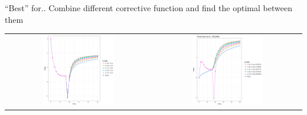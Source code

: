 \documentclass{beamer}
\begin{document}
\begin{frame}{``Best'' for..}
	Combine different corrective function and find the optimal between them
	\begin{table}
		\begin{tabular}{ cc }
			\includegraphics[width=0.5\textwidth]{multi_issues_v1_correction.png} &
			\includegraphics[width=0.5\textwidth]{multi_issues_v1_result.png} \\
		\end{tabular}
	\end{table}
\end{frame}
\end{document}
